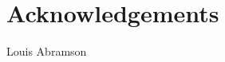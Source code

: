 \documentclass[12pt, letterpaper, preprint]{aastex}
\begin{document}
\section*{Acknowledgements}
Louis Abramson



\end{document}

